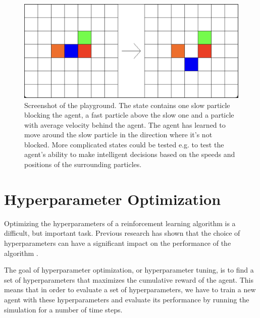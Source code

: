 \begin{figure}[h]
    \centering
    \includegraphics[width=\textwidth]{playground.png}
    \caption{Screenshot of the playground. The state contains one slow particle blocking the agent, a fast particle above the slow one and a particle with average velocity behind the agent. The agent has learned to move around the slow particle in the direction where it's not blocked. More complicated states could be tested e.g. to test the agent's ability to make intelligent decisions based on the speeds and positions of the surrounding particles.}
    \label{fig:playground}
\end{figure}


\section{Hyperparameter Optimization}
\label{sec:hyperparam_optim}
Optimizing the hyperparameters of a reinforcement learning algorithm is a difficult, but important task. Previous research has shown that the choice of hyperparameters can have a significant impact on the performance of the algorithm \cite{henderson_deep_2019,parker-holder_automated_2022,noauthor_automl_nodate}. 


The goal of hyperparameter optimization, or hyperparameter tuning, is to find a set of hyperparameters that maximizes the cumulative reward of the agent. This means that in order to evaluate a set of hyperparameters, we have to train a new agent with these hyperparameters and evaluate its performance by running the simulation for a number of time steps. 


